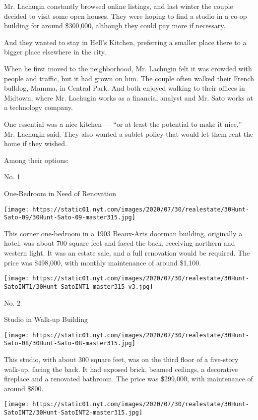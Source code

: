 Mr. Lachugin constantly browsed online listings, and last winter the
couple decided to visit some open houses. They were hoping to find a
studio in a co-op building for around \$300,000, although they could pay
more if necessary.

And they wanted to stay in Hell's Kitchen, preferring a smaller place
there to a bigger place elsewhere in the city.

When he first moved to the neighborhood, Mr. Lachugin felt it was
crowded with people and traffic, but it had grown on him. The couple
often walked their French bulldog, Mamma, in Central Park. And both
enjoyed walking to their offices in Midtown, where Mr. Lachugin works as
a financial analyst and Mr. Sato works at a technology company.

One essential was a nice kitchen --- ``or at least the potential to make
it nice,'' Mr. Lachugin said. They also wanted a sublet policy that
would let them rent the home if they wished.

Among their options:

No. 1

One-Bedroom in Need of Renovation

\texttt{[image: https://static01.nyt.com/images/2020/07/30/realestate/30Hunt-Sato-09/30Hunt-Sato-09-master315.jpg]}

This corner one-bedroom in a 1903 Beaux-Arts doorman building,
originally a hotel, was about 700 square feet and faced the back,
receiving northern and western light. It was an estate sale, and a full
renovation would be required. The price was \$498,000, with monthly
maintenance of around \$1,100.

\texttt{[image: https://static01.nyt.com/images/2020/07/30/realestate/30Hunt-SatoINT1/30Hunt-SatoINT1-master315-v3.jpg]}

No. 2

Studio in Walk-up Building

\texttt{[image: https://static01.nyt.com/images/2020/07/30/realestate/30Hunt-Sato-08/30Hunt-Sato-08-master315.jpg]}

This studio, with about 300 square feet, was on the third floor of a
five-story walk-up, facing the back. It had exposed brick, beamed
ceilings, a decorative fireplace and a renovated bathroom. The price was
\$299,000, with maintenance of around \$800.

\texttt{[image: https://static01.nyt.com/images/2020/07/30/realestate/30Hunt-SatoINT2/30Hunt-SatoINT2-master315.jpg]}

